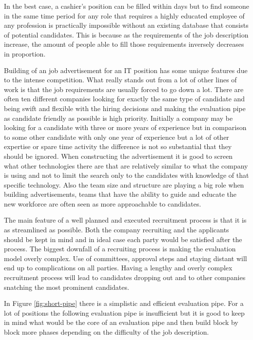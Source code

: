 \documentclass[11pt,a4paper,oneside,article]{memoir}
\begin{document}
In the best case, a cashier's position can be filled within days but to find someone in the same time period for any role that requires a highly educated employee of any profession is practically impossible without an existing database that consists of potential candidates. This is because as the requirements of the job description increase, the amount of people able to fill those requirements inversely decreases in proportion.

Building of an job advertisement for an IT position has some unique features due to the intense competition. What really stands out from a lot of other lines of work is that the job requirements are usually forced to go down a lot. There are often ten different companies looking for exactly the same type of candidate and being swift and flexible with the hiring decisions and making the evaluation pipe as candidate friendly as possible is high priority. Initially a company may be looking for a candidate with three or more years of experience but in comparison to some other candidate with only one year of experience but a lot of other expertise or spare time activity the difference is not so substantial that they should be ignored. When constructing the advertisement it is good to screen what other technologies there are that are relatively similar to what the company is using and not to limit the search only to the candidates with knowledge of that specific technology. Also the team size and structure are playing a big role when building advertisements, teams that have the ability to guide and educate the new workforce are often seen as more approachable to candidates. \cite{noora:conversation}

The main feature of a well planned and executed recruitment process is that it is as streamlined as possible. Both the company recruiting and the applicants should be kept in mind and in ideal case each party would be satisfied after the process. The biggest downfall of a recruiting process is making the evaluation model overly complex. Use of committees, approval steps and staying distant will end up to complications on all parties. Having a lengthy and overly complex recruitment process will lead to candidates dropping out and to other companies snatching the most prominent candidates. \cite[p.~42]{mcculler:book}

In Figure \vref{fig:short-pipe} there is a simplistic and efficient evaluation pipe. For a lot of positions the following evaluation pipe is insufficient but it is good to keep in mind what would be the core of an evaluation pipe and then build block by block more phases depending on the difficulty of the job description.
\end{document}
